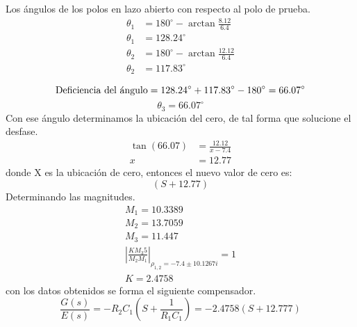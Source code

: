 \documentclass[10pt, a4paper]{report}
\begin{document}
Los ángulos de los polos en lazo abierto con respecto al polo de prueba.
\begin{equation*}
  \begin{split}
    \theta_1 &= 180^{\circ} - \arctan \frac{8.12}{6.4}\\
    \theta_1 &= 128.24^{\circ}\\
    \theta_2 &= 180^{\circ} - \arctan \frac{12.12}{6.4}\\
    \theta_2 &= 117.83^{\circ}
  \end{split}
\end{equation*}

\begin{equation*}
   \textup{Deficiencia del ángulo}= 128.24^{\circ} + 117.83^{\circ} - 180^{\circ} = 66.07^{\circ}
\end{equation*}
\begin{equation*}
    \theta_3 = 66.07^{\circ}
 \end{equation*}
 Con ese ángulo determinamos la ubicación del cero, de tal forma que solucione el desfase.
 \begin{equation*}
  \begin{split}
  \tan (66.07)&= \frac{12.12}{x -7.4}\\
  x &= 12.77
  \end{split}
 \end{equation*}
 donde X es la ubicación de cero, entonces el nuevo valor de cero es:
 \begin{equation*}
   (S+12.77)
 \end{equation*}
  Determinando las magnitudes.
  \begin{equation*}
    \begin{split}
    M_1 = 10.3389\\
    M_2 = 13.7059\\
    M_3 = 11.447\\
    \left\lvert \frac{K M_3 5 }{M_2 M_1}\right\rvert_{\rho_{1,2}=-7.4\pm 10.1267i} = 1 \\
    K=2.4758
    \end{split}
  \end{equation*}
   con los datos obtenidos se forma el siguiente compensador.
   \begin{equation*}
     \frac{G(s)}{E(s)} = - R_2 C_1 (S+\frac{1}{R_1 C_1}) =- 2.4758(S+ 12.777)
   \end{equation*}
\end{document}
